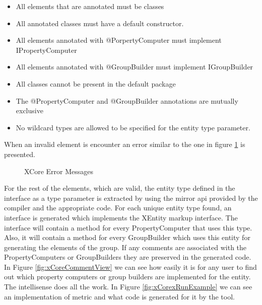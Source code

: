 	\begin{itemize}
	  \item All elements that are annotated must be classes
	  \item All annotated classes must have a default constructor.
	  \item All elements annotated with @PorpertyComputer must implement
 IPropertyComputer
 	  \item All elements annotated with @GroupBuilder must implement
 IGroupBuilder
 	  \item  All classes cannot be present in the default package
 	  \item  The @PropertyComputer and @GroupBuilder annotations are mutually
exclusive
	  \item  No wildcard types are allowed to be specified for the entity type
 parameter.
	\end{itemize}
	When an invalid element is encounter an error similar to the one in figure
\ref{fig:xCorexError} is presented.
\begin{figure}
\centering
{}
\caption{XCore Error Messages}
\label{fig:xCorexError}
\end{figure}
	For the rest of the elements, which are valid, the entity type defined in the
interface as a type parameter is extracted by using the mirror api provided by
the compiler and the appropriate code. For each unique entity type found, an
interface is generated which implements the XEntity markup interface. The
interface will contain a method for every PropertyComputer that uses
this type. Also, it will contain a method for every GroupBuilder which uses
this entity for generating the elements of the group. If any comments are
associated with the PropertyComputers or GroupBuilders they are preserved in the
generated code. \\
In Figure \ref{fig:xCoreCommentView} we can see how easily it is for any user to
find out which property computers or group builders are implemented for the
entity. The intellisense does all the work.
In Figure \ref{fig:xCorexRunExample} we can see an implementation of metric and
what code is generated for it by the tool.


